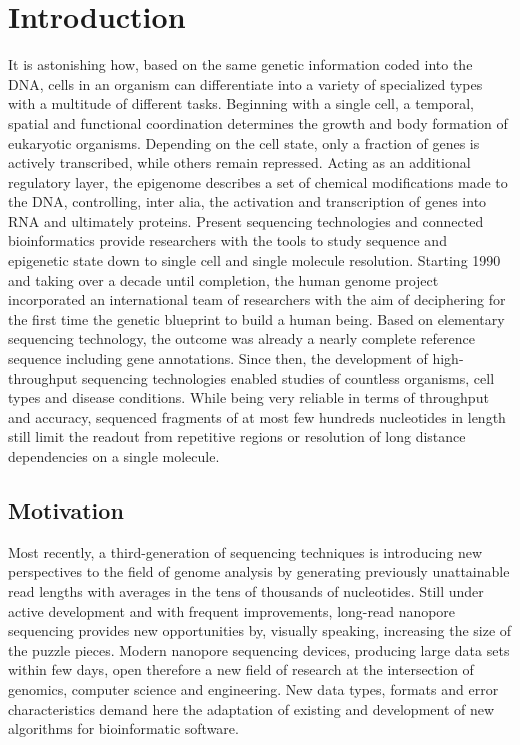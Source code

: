 \chapter{Introduction}
\label{cha:intro}

It is astonishing how, based on the same genetic information coded into the DNA, cells in an organism can differentiate into a variety of specialized types with a multitude of different tasks.
Beginning with a single cell, a temporal, spatial and functional coordination determines the growth and body formation of eukaryotic organisms.
Depending on the cell state, only a fraction of genes is actively transcribed, while others remain repressed.
Acting as an additional regulatory layer, the epigenome describes a set of chemical modifications made to the DNA, controlling, inter alia, the activation and transcription of genes into RNA and ultimately proteins.
Present sequencing technologies and connected bioinformatics provide researchers with the tools to study sequence and epigenetic state down to single cell and single molecule resolution.
Starting 1990 and taking over a decade until completion, the human genome project incorporated an international team of researchers with the aim of deciphering for the first time the genetic blueprint to build a human being. 
Based on elementary sequencing technology, the outcome was already a nearly complete reference sequence including gene annotations.
Since then, the development of high-throughput sequencing technologies enabled studies of countless organisms, cell types and disease conditions. 
While being very reliable in terms of throughput and accuracy, sequenced fragments of at most few hundreds nucleotides in length still limit the readout from repetitive regions or resolution of long distance dependencies on a single molecule.




\section{Motivation}
\label{sec:intro:motivation}

Most recently, a third-generation of sequencing techniques is introducing new perspectives to the field of genome analysis by generating previously unattainable read lengths with averages in the tens of thousands of nucleotides. 
Still under active development and with frequent improvements, long-read nanopore sequencing provides new opportunities by, visually speaking, increasing the size of the puzzle pieces.
Modern nanopore sequencing devices, producing large data sets within few days, open therefore a new field of research at the intersection of genomics, computer science and engineering. 
New data types, formats and error characteristics demand here the adaptation of existing and development of new algorithms for bioinformatic software.




